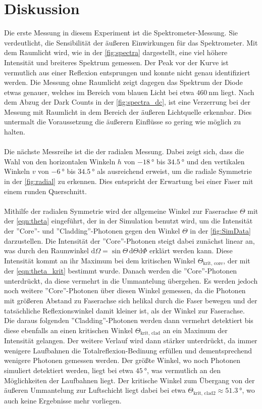 \section{Diskussion}
\label{sec:Discussion}
Die erste Messung in diesem Experiment ist die Spektrometer-Messung. Sie verdeutlicht, die Sensibilität der äußeren Einwirkungen für das Spektrometer. Mit dem Raumlicht wird, wie in der \autoref{fig:spectra} dargestellt, eine viel höhere Intensität und breiteres Spektrum gemessen. Der Peak vor der Kurve ist vermutlich aus einer Reflexion entsprungen und konnte nicht genau identifiziert werden. Die Messung ohne Raumlicht zeigt dagegen das Spektrum der Diode etwas genauer, welches im Bereich vom blauen Licht bei etwa $\SI{460}{\nano\meter}$ liegt. Nach dem Abzug der Dark Counts in der \autoref{fig:spectra_dc}, ist eine Verzerrung bei der Messung mit Raumlicht in dem Bereich der äußeren Lichtquelle erkennbar. Dies untermalt die Voraussetzung die äußerern Einflüsse so gering wie möglich zu halten.\\\\
Die nächste Messreihe ist die der radialen Messung. Dabei zeigt sich, dass die Wahl von den horizontalen Winkeln $h$ von $\SI{-18}{\degree}$ bis $\SI{34.5}{\degree}$ und den vertikalen Winkeln $v$ von $\SI{-6}{\degree}$ bis $\SI{34.5}{\degree}$ als ausreichend erweist, um die radiale Symmetrie in der \autoref{fig:radial} zu erkennen. Dies entspricht der Erwartung bei einer Faser mit einem runden Querschnitt.\\\\
Mithilfe der radialen Symmetrie wird der allgemeine Winkel zur Faserachse $\Theta$ mit der \autoref{eqn:theta} eingeführt, der in der Simulation benutzt wird, um die Intensität der ''Core''- und ''Cladding''-Photonen gegen den Winkel $\Theta$ in der \autoref{fig:SimData} darzustellen. Die Intensität der ''Core''-Photonen steigt dabei zunächst linear an, was durch den Raumwinkel $\text{d}\Omega = \sin{\Theta}\, \text{d}\Theta \text{d}\Phi$ erklärt werden kann. Diese Intensität kommt an ihr Maximum bei dem kritischen Winkel $\Theta_{\text{krit, core}}$, der mit der \autoref{eqn:theta_krit} bestimmt wurde. Danach werden die ''Core''-Photonen unterdrückt, da diese vermehrt in die Ummantelung übergehen. Es werden jedoch noch weitere ''Core''-Photonen über diesen Winkel gemessen, da die Photonen mit größeren Abstand zu Faserachse sich helikal durch die Faser bewegen und der tatsächliche Reflexionswinkel damit kleiner ist, als der Winkel zur Faserachse.\\
Die daraus folgenden ''Cladding''-Photonen werden dann vermehrt detektiert bis diese ebenfalls an einen kritischen Winkel $\Theta_{\text{krit, clad}}$ an ein Maximum der Intensität gelangen. Der weitere Verlauf wird dann stärker unterdrückt, da immer wenigere Laufbahnen die Totalreflexion-Bedinung erfüllen und dementsprechend wenigere Photonen gemessen werden. Der größte Winkel, wo noch Photonen simuliert detektiert werden, liegt bei etwa $\SI{45}{\degree}$, was vermutlich an den Möglichkeiten der Laufbahnen liegt. Der kritische Winkel zum Übergang von der äußeren Ummantelung zur Luftschicht liegt dabei bei etwa $\Theta_{\text{krit, clad2}} \approx \SI{51.3}{\degree}$, wo auch keine Ergebnisse mehr vorliegen.\\
